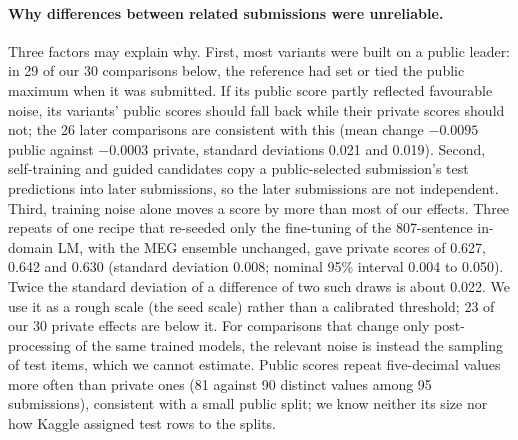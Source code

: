 \documentclass{article}
\begin{document}
\paragraph{Why differences between related submissions were unreliable.} Three factors may explain why. First, most variants were built on a public leader: in 29 of our 30 comparisons below, the reference had set or tied the public maximum when it was submitted. If its public score partly reflected favourable noise, its variants' public scores should fall back while their private scores should not; the 26 later comparisons are consistent with this (mean change $-0.0095$ public against $-0.0003$ private, standard deviations 0.021 and 0.019). Second, self-training and guided candidates copy a public-selected submission's test predictions into later submissions, so the later submissions are not independent. Third, training noise alone moves a score by more than most of our effects. Three repeats of one recipe that re-seeded only the fine-tuning of the 807-sentence in-domain LM, with the MEG ensemble unchanged, gave private scores of 0.627, 0.642 and 0.630 (standard deviation 0.008; nominal 95\% interval 0.004 to 0.050). Twice the standard deviation of a difference of two such draws is about 0.022. We use it as a rough scale (the seed scale) rather than a calibrated threshold; 23 of our 30 private effects are below it. For comparisons that change only post-processing of the same trained models, the relevant noise is instead the sampling of test items, which we cannot estimate. Public scores repeat five-decimal values more often than private ones (81 against 90 distinct values among 95 submissions), consistent with a small public split; we know neither its size nor how Kaggle assigned test rows to the splits.

\begin{table}[t]
  \caption{Seventeen of the 30 reference--variant comparisons, covering the components of Section~\ref{sec:system} (change in BAcc@10, variant minus reference), with the direction suggested by component-level validation recorded before the private release ($+$ helps, $-$ hurts; n/a: no matched validation difference above the proxy noise of about 0.015). $^\dagger$: bundle of several changes.}
  \label{tab:pairs}
  \centering
  
\end{table}
\end{document}

